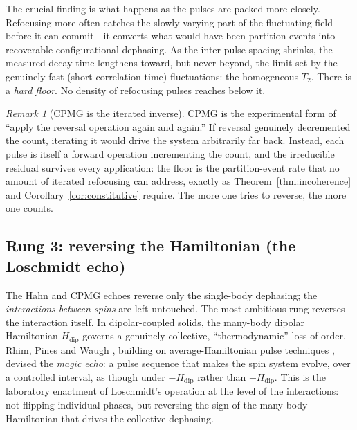\documentclass[11pt,a4paper]{article}
\theoremstyle{thmstyle}
\theoremstyle{definition}
\theoremstyle{remark}
\newtheorem{remark}[theorem]{Remark}
\newcommand{\Ttwo}{T_{2}}
\begin{document}
The crucial finding is what happens as the pulses are packed more closely.
Refocusing more often catches the slowly varying part of the fluctuating
field before it can commit---it converts what would have been partition
events into recoverable configurational dephasing. As the inter-pulse
spacing shrinks, the measured decay time lengthens toward, but never
beyond, the limit set by the genuinely fast (short-correlation-time)
fluctuations: the homogeneous $\Ttwo$. There is a \emph{hard floor}. No
density of refocusing pulses reaches below it.

\begin{remark}[CPMG is the iterated inverse]
\label{rem:cpmg-iterated}
CPMG is the experimental form of ``apply the reversal operation again and
again.'' If reversal genuinely decremented the count, iterating it would
drive the system arbitrarily far back. Instead, each pulse is itself a
forward operation incrementing the count, and the irreducible residual
survives every application: the floor is the partition-event rate that no
amount of iterated refocusing can address, exactly as
Theorem~\ref{thm:incoherence} and Corollary~\ref{cor:constitutive}
require. The more one tries to reverse, the more one counts.
\end{remark}

\subsection{Rung 3: reversing the Hamiltonian (the Loschmidt echo)}
\label{sec:rung-loschmidt}

The Hahn and CPMG echoes reverse only the single-body dephasing; the
\emph{interactions between spins} are left untouched. The most ambitious
rung reverses the interaction itself. In dipolar-coupled solids, the
many-body dipolar Hamiltonian $H_{\mathrm{dip}}$ governs a genuinely
collective, ``thermodynamic'' loss of order. Rhim, Pines and Waugh
\citep{rhim1970,rhim1971}, building on average-Hamiltonian pulse
techniques \citep{waugh1968}, devised the \emph{magic echo}: a pulse
sequence that makes the spin system evolve, over a controlled interval,
as though under $-H_{\mathrm{dip}}$ rather than $+H_{\mathrm{dip}}$. This
is the laboratory enactment of Loschmidt's operation at the level of the
interactions: not flipping individual phases, but reversing the sign of
the many-body Hamiltonian that drives the collective dephasing.
\end{document}
